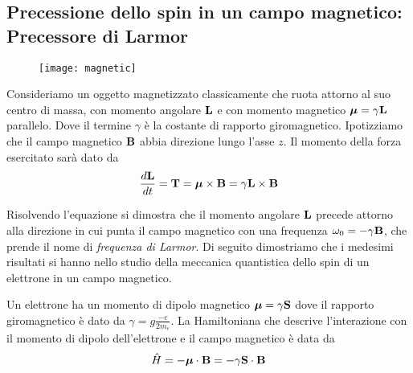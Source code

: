 \subsection{Precessione dello spin in un campo magnetico: Precessore di Larmor}

\begin{wrapfigure}{r}{0.4\textwidth} %
    \centering
    \texttt{[image: magnetic]} %
\end{wrapfigure}

Consideriamo un oggetto magnetizzato classicamente che ruota attorno al suo centro di massa, con momento angolare $\bold{L}$ e con momento magnetico $\boldsymbol{\mu} = \gamma \bold{L}$ parallelo.
 Dove il termine $\gamma$ \`e la costante di rapporto giromagnetico. Ipotizziamo che il campo magnetico $\bold{B}$ abbia direzione lungo l'asse $z$. Il momento della forza esercitato sar\`a dato da 
 \begin{equation*}
 	\frac{d \bold{L}}{dt} = \bold{T} = \boldsymbol{\mu} \times \bold{B} = \gamma \bold{L} \times \bold{B} 
 \end{equation*}
 
Risolvendo l'equazione si dimostra che il momento angolare $\bold{L}$  precede attorno alla direzione in cui punta il campo magnetico con una frequenza $\omega_0 = - \gamma \bold{B}$, che prende il nome di \textit{frequenza di Larmor}. Di seguito dimostriamo che i medesimi risultati si hanno nello studio della meccanica quantistica dello spin di un elettrone in un campo magnetico.
\newline

\noindent Un elettrone ha un momento di dipolo magnetico $\boldsymbol{\mu} = \gamma \bold{S}$ dove il rapporto giromagnetico \`e dato da $\gamma = g \frac{-e}{2m_e}$. La Hamiltoniana che descrive l'interazione con il momento di dipolo dell'elettrone e il campo magnetico \`e data da
\begin{equation*}
	\hat{H} =- \boldsymbol{\mu} \cdot \bold{B} = - \gamma \bold{S} \cdot \bold{B}
\end{equation*} 
\newpage

